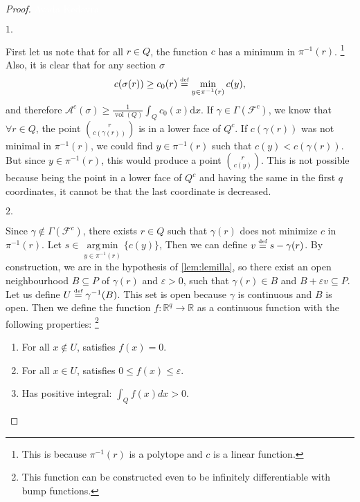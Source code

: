 \documentclass[10pt,a4paper]{article}
\DeclareMathOperator{\vol}{vol}
\DeclareMathOperator*{\argmin}{arg\,min}
\def\defs{\stackrel{\tiny{\mbox{def}}}{=}}		%
\newcommand{\RR}{\mathbb{R}}
\newcommand{\eps}{\varepsilon}
\theoremstyle{plain}
\theoremstyle{remark}
\theoremstyle{definition}
\begin{document}
    \begin{proof}
        \textcolor{white}{Avada Kedavra}
        
        $\boxed{1.}$
        
        First let us note that for all $r\in Q$, 
        the function $c$ has a minimum in $\pi^{-1}(r)$.
        \footnote{This is because $\pi^{-1}(r)$ is a polytope and $c$ is a linear function.}
        Also, it is clear that for any section $\sigma$
        \begin{equation}
        c(\sigma(r)) \geq c_0(r) \defs  \min_{y\in\pi^{-1}(r)}c(y),
        \end{equation}
        and therefore 
        $\mathcal{A}^c(\sigma) \geq \frac1{\vol(Q)}\int_Q c_0(x) \mathrm{ d}x$.
        If $\gamma\in \Gamma(\mathcal{F}^c)$, we know that $\forall r\in Q$,
        the point $\binom{r}{c(\gamma(r))}$ is in a lower face of $Q^c$. 
        If $c(\gamma(r))$ was not minimal in $\pi^{-1}(r)$, 
        we could find $y\in \pi^{-1}(r)$ such that $c(y) < c( \gamma(r))$.
        But since $y\in\pi^{-1}(r)$, this would produce a point $\binom{r}{c(y)}$.
        This is not possible because being the point in a lower face of $Q^c$ 
        and having the same in the first $q$ coordinates, 
        it cannot be that the last coordinate is decreased.
        
        $\boxed{2. }$
        
        Since $\gamma\notin\Gamma(\mathcal{F}^c)$, 
        there exists $r\in Q$ such that $\gamma(r)$ does not minimize $c$ in $\pi^{-1}(r)$. 
        Let $s \in \argmin\limits_{y\in\pi^{-1}(r)}\{c(y)\}$,
        Then we can define $v\defs s - \gamma(r)$. 
        By construction, we are in the hypothesis of \cref{lem:lemilla}, 
        so there exist an open neighbourhood $B\subseteq P$ of $\gamma(r)$ and $\eps > 0$,  such that
        $\gamma(r)\in B$ and $B+\eps v \subseteq P$. 
        Let us define $U \defs \gamma^{-1}(B)$.
        This set is open because $\gamma$ is continuous and $B$ is open.
        Then we define the function $f \colon \RR^q \to \RR$
        as a continuous function with the following properties:
        \footnote{This function can be constructed even to be infinitely differentiable
            with bump functions.}
        \begin{enumerate}
            \item For all $x\notin U$, satisfies $f(x) = 0$.
            \item For all $x\in U$, satisfies $0 \leq f(x) \leq \eps$.
            \item \label{itm:prova} Has positive integral: $\int_Q f(x) dx > 0$.
        \end{enumerate}
        

\end{proof}
\end{document}
